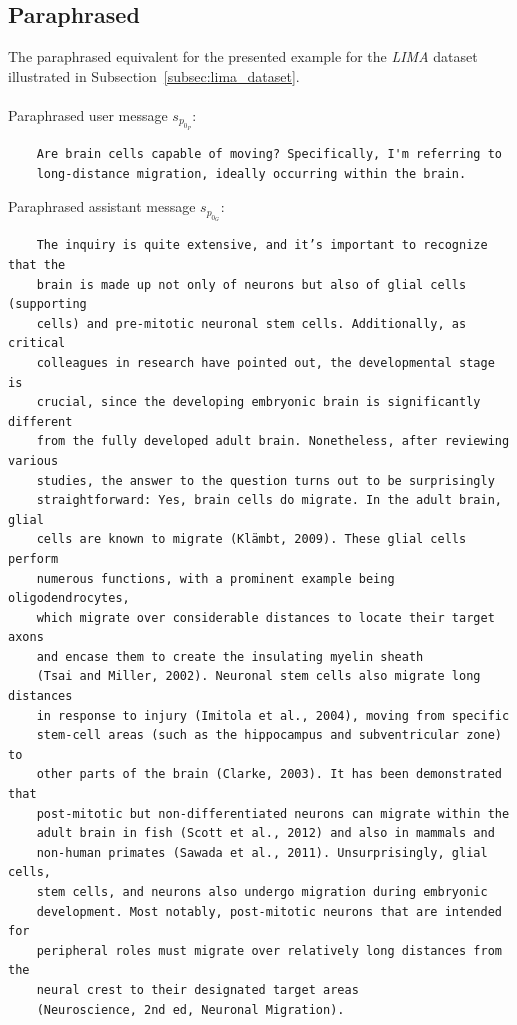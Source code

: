 \subsection{Paraphrased}\label{subsec:appendix_paraphrased_sample}
The paraphrased equivalent for the presented example for the \emph{LIMA} dataset illustrated in Subsection~\ref{subsec:lima_dataset}.
\\\\
Paraphrased user message $s_{p_{0_P}}$:
\begin{verbatim}
    Are brain cells capable of moving? Specifically, I'm referring to 
    long-distance migration, ideally occurring within the brain.
\end{verbatim}
Paraphrased assistant message $s_{p_{0_G}}$:
\begin{verbatim}
    The inquiry is quite extensive, and it’s important to recognize that the
    brain is made up not only of neurons but also of glial cells (supporting 
    cells) and pre-mitotic neuronal stem cells. Additionally, as critical 
    colleagues in research have pointed out, the developmental stage is 
    crucial, since the developing embryonic brain is significantly different 
    from the fully developed adult brain. Nonetheless, after reviewing various 
    studies, the answer to the question turns out to be surprisingly 
    straightforward: Yes, brain cells do migrate. In the adult brain, glial 
    cells are known to migrate (Klämbt, 2009). These glial cells perform 
    numerous functions, with a prominent example being oligodendrocytes, 
    which migrate over considerable distances to locate their target axons 
    and encase them to create the insulating myelin sheath 
    (Tsai and Miller, 2002). Neuronal stem cells also migrate long distances
    in response to injury (Imitola et al., 2004), moving from specific 
    stem-cell areas (such as the hippocampus and subventricular zone) to 
    other parts of the brain (Clarke, 2003). It has been demonstrated that 
    post-mitotic but non-differentiated neurons can migrate within the 
    adult brain in fish (Scott et al., 2012) and also in mammals and 
    non-human primates (Sawada et al., 2011). Unsurprisingly, glial cells, 
    stem cells, and neurons also undergo migration during embryonic 
    development. Most notably, post-mitotic neurons that are intended for 
    peripheral roles must migrate over relatively long distances from the 
    neural crest to their designated target areas 
    (Neuroscience, 2nd ed, Neuronal Migration).
\end{verbatim}

